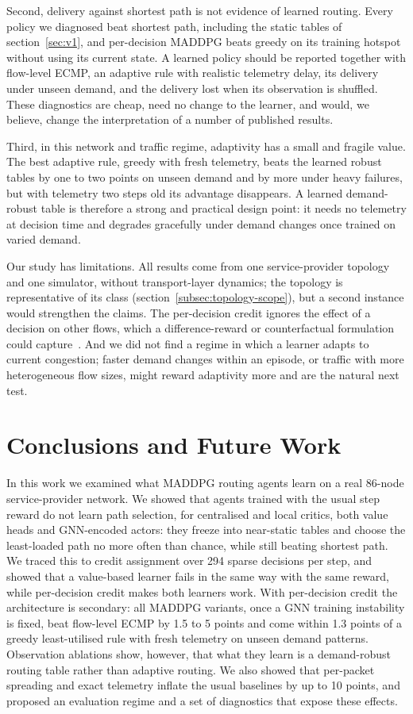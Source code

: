 \documentclass[10pt,journal,comsoc]{IEEEtran}
\begin{document}
Second, delivery against shortest path is not evidence of learned routing. Every policy we diagnosed beat shortest path, including the static tables of section~\ref{sec:v1}, and per-decision MADDPG beats greedy on its training hotspot without using its current state. A learned policy should be reported together with flow-level ECMP, an adaptive rule with realistic telemetry delay, its delivery under unseen demand, and the delivery lost when its observation is shuffled. These diagnostics are cheap, need no change to the learner, and would, we believe, change the interpretation of a number of published results.

Third, in this network and traffic regime, adaptivity has a small and fragile value. The best adaptive rule, greedy with fresh telemetry, beats the learned robust tables by one to two points on unseen demand and by more under heavy failures, but with telemetry two steps old its advantage disappears. A learned demand-robust table is therefore a strong and practical design point: it needs no telemetry at decision time and degrades gracefully under demand changes once trained on varied demand.

Our study has limitations. All results come from one service-provider topology and one simulator, without transport-layer dynamics; the topology is representative of its class (section~\ref{subsec:topology-scope}), but a second instance would strengthen the claims. The per-decision credit ignores the effect of a decision on other flows, which a difference-reward or counterfactual formulation could capture~\cite{agogino2004unifying,foerster2018counterfactual}. And we did not find a regime in which a learner adapts to current congestion; faster demand changes within an episode, or traffic with more heterogeneous flow sizes, might reward adaptivity more and are the natural next test.

\section{Conclusions and Future Work}\label{conclusion}
In this work we examined what MADDPG routing agents learn on a real 86-node service-provider network. We showed that agents trained with the usual step reward do not learn path selection, for centralised and local critics, both value heads and GNN-encoded actors: they freeze into near-static tables and choose the least-loaded path no more often than chance, while still beating shortest path. We traced this to credit assignment over 294 sparse decisions per step, and showed that a value-based learner fails in the same way with the same reward, while per-decision credit makes both learners work. With per-decision credit the architecture is secondary: all MADDPG variants, once a GNN training instability is fixed, beat flow-level ECMP by 1.5 to 5 points and come within 1.3 points of a greedy least-utilised rule with fresh telemetry on unseen demand patterns. Observation ablations show, however, that what they learn is a demand-robust routing table rather than adaptive routing. We also showed that per-packet spreading and exact telemetry inflate the usual baselines by up to 10 points, and proposed an evaluation regime and a set of diagnostics that expose these effects.
\end{document}
